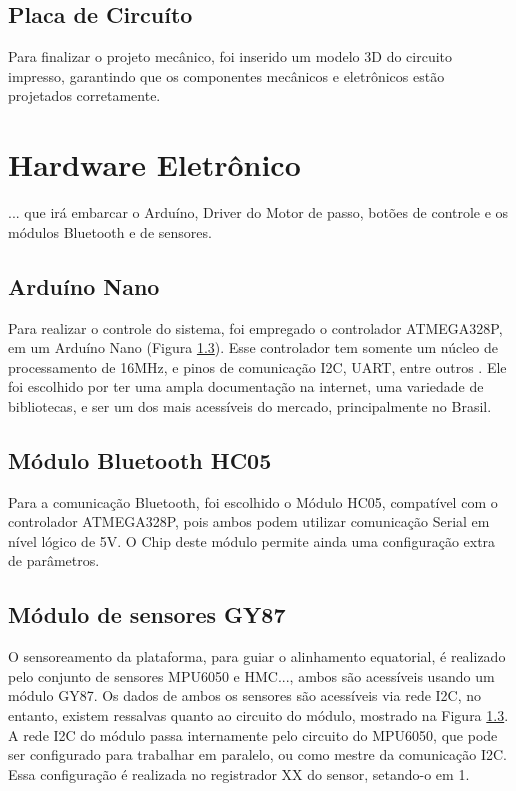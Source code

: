 \subsection{Placa de Circuíto}
Para finalizar o projeto mecânico, foi inserido um modelo 3D do circuito impresso, garantindo que os componentes mecânicos e eletrônicos estão projetados corretamente.

\section{Hardware Eletrônico}

... que irá embarcar o Arduíno, Driver do Motor de passo, botões de controle e os módulos Bluetooth e de sensores. 

\subsection{Arduíno Nano}
Para realizar o controle do sistema, foi empregado o controlador ATMEGA328P, em um Arduíno Nano (Figura \ref{}). Esse controlador tem somente um núcleo de processamento de 16MHz, e pinos de comunicação I2C, UART, entre outros \cite{}. Ele foi escolhido por ter uma ampla documentação na internet, uma variedade de bibliotecas, e ser um dos mais acessíveis do mercado, principalmente no Brasil. 

\subsection{Módulo Bluetooth HC05}
Para a comunicação Bluetooth, foi escolhido o Módulo HC05, compatível com o controlador ATMEGA328P, pois ambos podem utilizar comunicação Serial em nível lógico de 5V. O Chip deste módulo permite ainda uma configuração extra de parâmetros.

\subsection{Módulo de sensores GY87}
O sensoreamento da plataforma, para guiar o alinhamento equatorial, é realizado pelo conjunto de sensores MPU6050 e HMC..., ambos são acessíveis usando um módulo GY87. Os dados de ambos os sensores são acessíveis via rede I2C, no entanto, existem ressalvas quanto ao circuito do módulo, mostrado na Figura \ref{}. A rede I2C do módulo passa internamente pelo circuito do MPU6050, que pode ser configurado para trabalhar em paralelo, ou como mestre da comunicação I2C. Essa configuração é realizada no registrador XX do sensor, setando-o em 1. 



